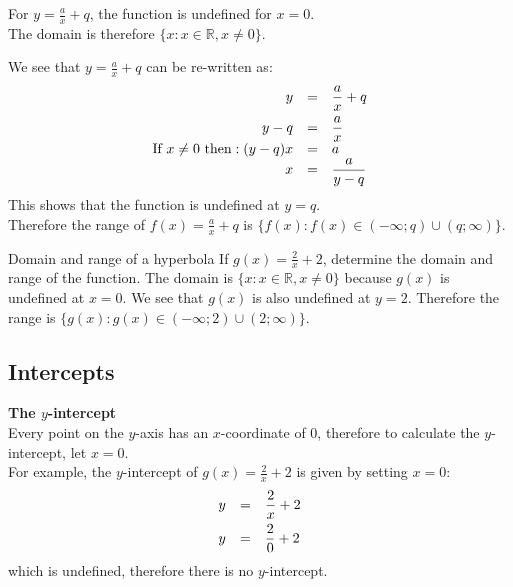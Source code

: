 For $y=\frac{a}{x}+q$, the function is undefined for $x=0$. \\
The domain is therefore $\{x:x\in \mathbb{R},x\ne 0\}$.\par 
We see that $y=\frac{a}{x}+q$ can be re-written as:
\begin{equation*}
\begin{array}{ccl}\hfill y& =& \dfrac{a}{x}+q\hfill \vspace{4pt} \\
 \hfill y-q& =& \dfrac{a}{x}\hfill \\
 \hfill \mbox{If }x \ne  0 \mbox{ then}:(y-q)x& =& a\hfill \\
 \hfill x& =& \dfrac{a}{y-q}\hfill 
\end{array}
\end{equation*}
This shows that the function is undefined at $y=q$. \\
Therefore the range of $f(x)=\frac{a}{x}+q$ is $\{f(x):f(x)\in (-\infty ;q)\cup (q;\infty )\}$.\par 

\begin{wex}{Domain and range of a hyperbola}
{If $g(x)=\frac{2}{x}+2$, determine the domain and range of the function.}
{
The domain is $\{x:x\in \mathbb{R},x\ne 0\}$ because $g(x)$ is undefined at $x=0$.
We see that $g(x)$ is also undefined at $y=2$. Therefore the range is $\{g(x):g(x)\in (-\infty ;2)\cup (2;\infty )\}$.
}
\end{wex}


\subsection*{Intercepts}

\textbf{The $y$-intercept} \\
Every point on the $y$-axis has an $x$-coordinate of $0$, therefore to calculate the $y$-intercept, let $x=0$.\\
For example, the $y$-intercept of $g(x)=\frac{2}{x}+2$ is given by setting $x=0$:
\begin{equation*}
\begin{array}{ccc}\hfill y& =& \dfrac{2}{x}+2\hfill \vspace{4pt}\\
 \hfill y& =& \dfrac{2}{0}+2\hfill 
\end{array}
\end{equation*}
which is undefined, therefore there is no $y$-intercept.\\
\\

